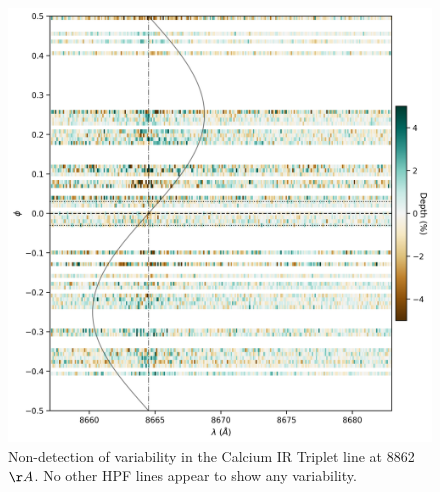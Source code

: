 \documentclass[twocolumn]{aastex631}
\begin{document}
\begin{figure}[b]
    \includegraphics[width=0.5\linewidth]{figures/Ca8662_phase_2D_diagram_resid.png}
    \caption{Non-detection of variability in the Calcium IR Triplet line at 8862 $\AA$.  No other HPF lines appear to show any variability.}
    \label{fig:CaPhaseScan}
\end{figure}
\end{document}
